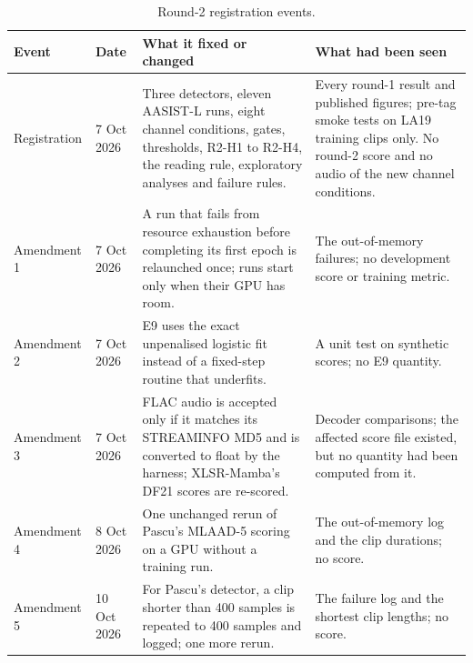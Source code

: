 \documentclass[10pt]{article}
\begin{document}
\begin{table}[!ht]
\caption{Round-2 registration events.}
\label{tab:dev2}
\centering
\footnotesize
\setlength{\tabcolsep}{3pt}
\begin{tabular}{@{}p{}p{}p{}p{}@{}}
\toprule
Event & Date & What it fixed or changed & What had been seen \\
\midrule
Registration & 7 Oct 2026 & Three detectors, eleven AASIST-L runs, eight channel conditions, gates, thresholds, R2-H1 to R2-H4,
the reading rule, exploratory analyses and failure rules. & Every round-1 result and published figures; pre-tag smoke
tests on LA19 training clips only. No round-2 score and no audio of the new channel conditions. \\
Amendment 1 & 7 Oct 2026 & A run that fails from resource exhaustion before completing its first epoch is relaunched
once; runs start only when their GPU has room. & The out-of-memory failures; no development score or training metric. \\
Amendment 2 & 7 Oct 2026 & E9 uses the exact unpenalised logistic fit instead of a fixed-step routine that underfits.
& A unit test on synthetic scores; no E9 quantity. \\
Amendment 3 & 7 Oct 2026 & FLAC audio is accepted only if it matches its STREAMINFO MD5 and is converted to float by
the harness; XLSR-Mamba's DF21 scores are re-scored. & Decoder comparisons; the affected score file existed, but no
quantity had been computed from it. \\
Amendment 4 & 8 Oct 2026 & One unchanged rerun of Pascu's MLAAD-5 scoring on a GPU without a training run. & The
out-of-memory log and the clip durations; no score. \\
Amendment 5 & 10 Oct 2026 & For Pascu's detector, a clip shorter than 400 samples is repeated to 400 samples and logged;
one more rerun. & The failure log and the shortest clip lengths; no score. \\
\bottomrule
\end{tabular}
\end{table}

\end{document}
